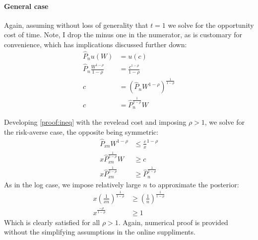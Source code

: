 \documentclass[a4paper,12pt]{article}
\begin{document}
\begin{appendices}
\paragraph{General case}

Again, assuming without loss of generality that $t = 1$ we solve for the opportunity cost of time. Note, I drop the minus one in the numerator, as is customary for convenience, which has implications discussed further down:
\begin{align*}
  \hat{P}_n u(W) &= u(c) \\
  \hat{P}_n  \frac{W^{1 - \rho}}{1 - \rho} &= \frac{c^{1 - \rho}}{1 - \rho} \\
  c &= \left( \hat{P}_n W^{1 - \rho} \right)^{\frac{1}{1 - \rho}} \\
  c &= \hat{P}_n^{\frac{1}{1 - \rho}} W
\end{align*}

Developing \ref{proof:ineq} with the revelead cost and imposing $\rho > 1$, we solve for the risk-averse case, the opposite being symmetric:
\begin{align*}
  \hat{P}_{xn}  W^{1 - \rho} &\leq \frac{c}{x}^{1 - \rho} \\
  x \hat{P}_{xn}^{\frac{1}{1 - \rho}}  W &\geq c \\
  x \hat{P}_{xn}^{\frac{1}{1 - \rho}}  &\geq \hat{P}_n^{\frac{1}{1 - \rho}}
\end{align*}
As in the log case, we impose relatively large $n$ to approximate the posterior:
\begin{align*}
  x \left( \frac{1}{xn} \right)^{\frac{1}{1 - \rho}}  &\geq \left( \frac{1}{n} \right)^{\frac{1}{1 - \rho}} \\
  x^{\frac{ - \rho}{1 - \rho}}  &\geq 1
\end{align*}
Which is clearly satisfied for all $\rho > 1$. Again, numerical proof is provided without the simplifying assumptions in the online suppliments.



\end{appendices}
\end{document}
